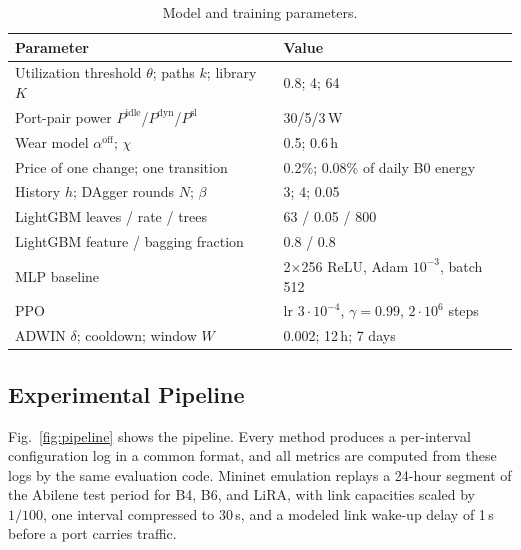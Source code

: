 \documentclass[conference]{IEEEtran}
\begin{document}
\begin{table}[t]
\centering
\caption{Model and training parameters.}
\label{tab:params}
\footnotesize
\setlength{\tabcolsep}{3pt}
\begin{tabular}{@{}p{4.75cm}p{3.75cm}@{}}
\toprule
Parameter & Value \\
\midrule
Utilization threshold $\theta$; paths $k$; library $K$ & 0.8; 4; 64 \\
Port-pair power $P^{\mathrm{idle}}$/$P^{\mathrm{dyn}}$/$P^{\mathrm{sl}}$ & 30/5/3\,W \\
Wear model $\alpha^{\mathrm{off}}$; $\chi$ & 0.5; 0.6\,h \\
Price of one change; one transition & 0.2\%; 0.08\% of daily B0 energy \\
History $h$; DAgger rounds $N$; $\beta$ & 3; 4; 0.05 \\
LightGBM leaves / rate / trees & 63 / 0.05 / 800 \\
LightGBM feature / bagging fraction & 0.8 / 0.8 \\
MLP baseline & 2$\times$256 ReLU, Adam $10^{-3}$, batch 512 \\
PPO & lr $3\cdot10^{-4}$, $\gamma=0.99$, $2\cdot10^{6}$ steps \\
ADWIN $\delta$; cooldown; window $W$ & 0.002; 12\,h; 7 days \\
\bottomrule
\end{tabular}
\end{table}

\subsection{Experimental Pipeline}

Fig.~\ref{fig:pipeline} shows the pipeline. Every method produces a per-interval configuration log in a common format, and all metrics are computed from these logs by the same evaluation code. Mininet emulation replays a 24-hour segment of the Abilene test period for B4, B6, and LiRA, with link capacities scaled by $1/100$, one interval compressed to 30\,s, and a modeled link wake-up delay of 1\,s before a port carries traffic.
\end{document}
